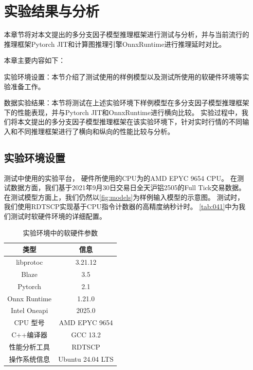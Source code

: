 \chapter{实验结果与分析}
\label{cha:04}

本章节将对本文提出的多分支因子模型推理框架进行测试与分析，并与当前流行的推理框架Pytorch JIT和计算图推理引擎OnnxRuntime进行推理延时对比。

本章主要内容如下： 

实验环境设置：本节介绍了测试使用的样例模型以及测试所使用的软硬件环境等实验准备工作。

数据实验结果：本节将测试在上述实验环境下样例模型在多分支因子模型推理框架下的性能表现，并与Pytorch JIT\cite{paszke2019pytorchimperativestylehighperformance}和OnnxRuntime进行横向比较。
实验过程中，我们将本文提出的多分支因子模型推理框架在该实验环境下，针对实时行情的不同输入和不同推理框架进行了横向和纵向的性能比较与分析。

\section{实验环境设置}
\label{cha:041}
测试中使用的实验平台， 硬件所使用的CPU为的AMD EPYC 9654 CPU。
在测试数据方面，我们基于2021年9月30日交易日全天沪铝2505的Full Tick交易数据。
在测试模型方面上，我们仍然以\autoref{fig:models}为样例输入模型的示意图。
测试时，我们使用RDTSCP实现基于CPU指令计数器的高精度纳秒计时。 
\autoref{tab:041}中为我们测试时软硬件环境的详细配置。

\begin{table}[h] %
    \centering
    \caption{实验环境中的软硬件参数}
    \begin{tabular}{|c|c|}
        \toprule
        \textbf{类型} & 信息 \\
        \midrule
        libprotoc & 3.21.12\\
        \midrule
        Blaze & 3.5\\
        \midrule
        Pytorch & 2.1\\
        \midrule
        Onnx Runtime & 1.21.0\\
        \midrule
        Intel Oneapi & 2025.0\\
        \midrule
        CPU 型号 & AMD EPYC 9654  \\
        \midrule
        C++编译器 & GCC 13.2\\
        \midrule
        性能分析工具 & RDTSCP\\
        \midrule
        操作系统信息 & Ubuntu 24.04 LTS \\
        \bottomrule
    \end{tabular}
    \label{tab:041}
\end{table}


